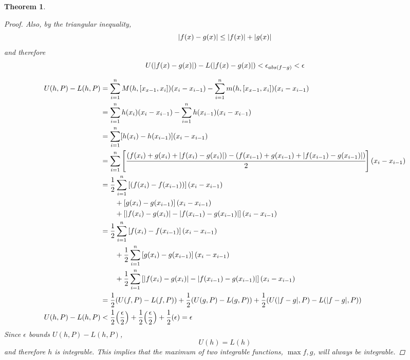\documentclass[]{article}
\newtheorem{theorem}{Theorem}
\begin{document}
\begin{theorem}
\begin{proof}
        Also, by the triangular inequality,\[
            \abs{f(x) - g(x)} \leq \abs{f(x)} + \abs{g(x)}
        \] and therefore \[
            U(\abs{f(x) - g(x)}) - L(\abs{f(x) - g(x)}) < \epsilon_{abs(f-g)} < \epsilon
        \]



        \begin{align*}
            U(h,P) - L(h,P) 
                &= \sum_{i=1}^n M(h,[x_{x-1},x_{i}])(x_{i}-x_{i-1}) 
                    - \sum_{i=1}^n m(h,[x_{x-1},x_{i}])(x_{i}-x_{i-1})\\
                &= \sum_{i=1}^n h(x_i) (x_{i}-x_{i-1}) 
                    - \sum_{i=1}^n h(x_{i-1}) (x_{i}-x_{i-1})\\
                &= \sum_{i=1}^n [h(x_i) - h(x_{i-1})] (x_{i}-x_{i-1})\\
                &= \sum_{i=1}^n \qty[
                    \cfrac{
                        \qty(f(x_{i}) + g(x_{i}) + \abs{f(x_{i}) - g(x_{i})})
                        - \qty(f(x_{i-1}) + g(x_{i-1}) + \abs{f(x_{i-1}) - g(x_{i-1})})
                    }{2}] (x_{i}-x_{i-1})\\
                &= \frac{1}{2} \sum_{i=1}^n \qty[
                    \qty(f(x_{i}) - f(x_{i-1})) ] (x_{i}-x_{i-1})\\
                    &\qquad+ \qty[g(x_{i}) - g(x_{i-1})] (x_{i}-x_{i-1})\\
                    &\qquad+ \qty[\abs{f(x_{i}) - g(x_{i})} - \abs{f(x_{i-1}) - g(x_{i-1})}
                    ] (x_{i}-x_{i-1})\\ 
                &= \frac{1}{2} \sum_{i=1}^n \qty[f(x_{i}) - f(x_{i-1})] (x_{i}-x_{i-1})\\
                    &\qquad + \frac{1}{2} \sum_{i=1}^n \qty[g(x_{i}) - g(x_{i-1})] (x_{i}-x_{i-1})\\
                    &\qquad + \frac{1}{2} \sum_{i=1}^n \qty[
                        \abs{f(x_{i}) - g(x_{i})} - \abs{f(x_{i-1}) - g(x_{i-1})}
                    ] (x_{i}-x_{i-1})\\
                &= \frac{1}{2} \qty(U(f,P) - L(f,P)) 
                        + \frac{1}{2} \qty(U(g,P) - L(g,P))
                        + \frac{1}{2} \qty(U(\abs{f-g},P) - L(\abs{f-g},P))\\
            U(h,P)-L(h,P) 
                &< \frac{1}{2} \qty(\frac{\epsilon}{2})
                    + \frac{1}{2} \qty(\frac{\epsilon}{2})
                    + \frac{1}{2} \qty(\epsilon)
                = \epsilon
        \end{align*}
        Since $\epsilon$ bounds $U(h,P) - L(h,P)$,\[
            U(h) = L(h)
        \] and therefore $h$ is integrable.
        This implies that the maximum of two integrable functions, 
        $\max{f,g}$, 
        will always be integrable.
    \end{proof}
\end{theorem}
\end{document}
